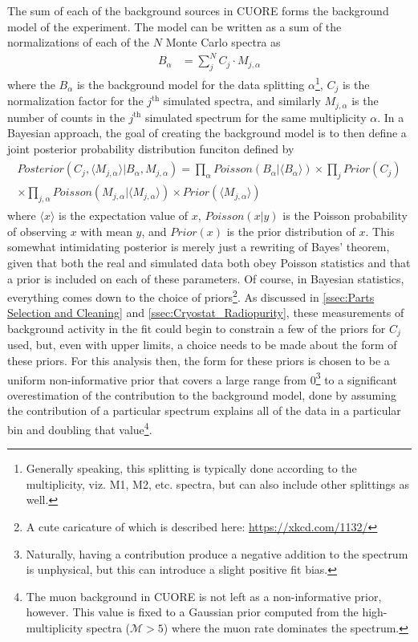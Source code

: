 The sum of each of the background sources in CUORE forms the background model of the experiment.
The model can be written as a sum of the normalizations of each of the $N$ Monte Carlo spectra as
\begin{align}
    B_\alpha &= \sum_j^N C_{j} \cdot M_{j,\alpha} 
\end{align}
where the $B_{\alpha}$ is the background model for the data splitting $\alpha$\footnote{Generally speaking, this splitting is typically done according to the multiplicity, viz. M1, M2, etc. spectra, but can also include other splittings as well.}, $C_{j}$ is the normalization factor for the $j^{\textrm{th}}$ simulated spectra, and similarly $M_{j,\alpha}$ is the number of counts in the $j^{\textrm{th}}$ simulated spectrum for the same multiplicity $\alpha$.
In a Bayesian approach, the goal of creating the background model is to then define a joint posterior probability distribution funciton defined by
\begin{align}
\begin{split}
        Posterior(C_j, \langle M_{j,\alpha}\rangle|B_\alpha, M_{j,\alpha}) = \prod_\alpha Poisson(B_\alpha|\langle B_\alpha\rangle)\times \prod_j Prior(C_j) \\ \times \prod_{j, \alpha}Poisson(M_{j,\alpha}|\langle M_{j,\alpha}\rangle) \times Prior(\langle M_{j,\alpha}\rangle)
\end{split}
\end{align}
where $\langle x \rangle$ is the expectation value of $x$, $Poisson(x|y)$ is the Poisson probability of observing $x$ with mean $y$, and $Prior(x)$ is the prior distribution of $x$.
This somewhat intimidating posterior is merely just a rewriting of Bayes' theorem, given that both the real and simulated data both obey Poisson statistics and that a prior is included on each of these parameters.
Of course, in Bayesian statistics, everything comes down to the choice of priors\footnote{\RaggedRight A cute caricature of which is described here: \url{https://xkcd.com/1132/}}.
As discussed in \autoref{ssec:Parts Selection and Cleaning} and \autoref{ssec:Cryostat_Radiopurity}, these measurements of background activity in the fit could begin to constrain a few of the priors for $C_j$ used, but, even with upper limits, a choice needs to be made about the form of these priors.
For this analysis then, the form for these priors is chosen to be a uniform non-informative prior that covers a large range from 0\footnote{Naturally, having a contribution produce a negative addition to the spectrum is unphysical, but this can introduce a slight positive fit bias.} to a significant overestimation of the contribution to the background model, done by assuming the contribution of a particular spectrum explains all of the data in a particular bin and doubling that value\footnote{The muon background in CUORE is not left as a non-informative prior, however.
This value is fixed to a Gaussian prior computed from the high-multiplicity spectra ($\mathcal{M}>5$) where the muon rate dominates the spectrum.}.
